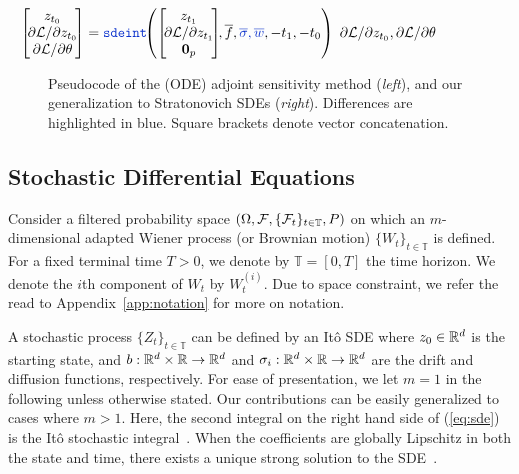\documentclass[twoside]{article}
\begin{document}
\begin{figure*}[h!]
\begin{minipage}[t]{0.49\linewidth}
\begin{algorithm}[H]
\begin{algorithmic}
				\vspace{.75mm}
				$\!\!\!\!\!\!\!\!\!\!\!\!\left[
				\begin{array}{c}
				\!\!\!\! \sol_\tstart \!\!\!\! \\
				\!\!\!\! {\partial \loss}/{\partial \sol_\tstart} \!\!\!\!\\
				\!\!\!\!  {\partial \loss}/{\partial \theta} \!\!\!\!
				\end{array} \right] = {\color{myfavblue}\textnormal{\texttt{sdeint}}}
				\!\!\left( \left[
				\begin{array}{c}
				\!\!\!\! \sol_\tend \!\!\!\! \\
				\!\!\!\! {\partial \loss}/{\partial \sol_\tend} \!\!\!\!\\
				\!\!\!\!  {\vzero}_p \!\!\!\!
				\end{array} \right] \!\!,
				\textnormal{$\overline f$}, {\color{myfavblue}\textnormal{$\overline \sigma$}, \textnormal{$\overline w$}}, 
				-\tend, -\tstart \right)$
				\Ensure ${\partial \mathcal{L}}/{\partial z_{t_\textnormal{0}}}, {\partial \mathcal{L}}/{\partial \theta }$
			\end{algorithmic}
		\end{algorithm}
	\end{minipage}
	\caption{
		Pseudocode of the (ODE) adjoint sensitivity method (\emph{left}), and our generalization to Stratonovich SDEs (\emph{right}).
		Differences are highlighted in blue. Square brackets denote vector concatenation. 
}
\end{figure*}



\subsection{Stochastic Differential Equations}

Consider a filtered probability space $(\Omega, \mathcal{F}, \{ \mathcal{F}_t \}_{t \in \mathbb{T}}, P)$ on which an $m$-dimensional adapted Wiener process (or Brownian motion) $\{ W_t \}_{t \in\mathbb{T} }$ is defined. 
For a fixed terminal time $T > 0$, we denote by $\mathbb{T} = [0, T] $ the time horizon.
We denote the $i$th component of $W_t$ by $W_t^{(i)}$. 
Due to space constraint, we refer the read to Appendix~\ref{app:notation} for more on notation. 

A stochastic process $\{Z_t\}_{t \in\mathbb{T}}$ can be defined by an It\^o SDE
where $z_0 \in \mathbb{R}^d$ is the starting state,
and $b: \mathbb{R}^d \times \mathbb{R} \to \mathbb{R}^d$ and $\sigma_i:\mathbb{R}^d \times \mathbb{R} \to \mathbb{R}^d$ are the drift and diffusion functions, respectively. 
For ease of presentation, we let $m=1$ in the following unless otherwise stated. Our contributions can be easily generalized to cases where $m > 1$.
Here, the second integral on the right hand side of (\ref{eq:sde}) is the It\^{o} stochastic integral~\cite{oksendal2003stochastic}. When the coefficients are globally Lipschitz in both the state and time, there exists a unique strong solution to the SDE~\cite{oksendal2003stochastic}. 
\end{document}
